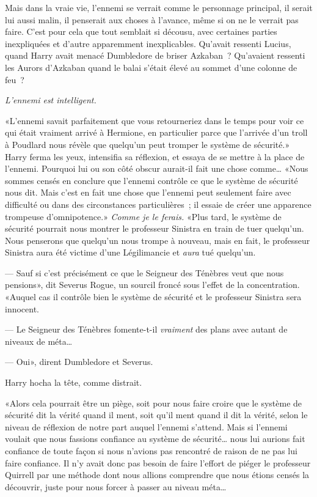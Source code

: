 Mais dans la vraie vie, l'ennemi se verrait comme le personnage principal, il serait lui aussi malin, il penserait aux choses à l'avance, même si on ne le verrait pas faire. C'est pour cela que tout semblait si décousu, avec certaines parties inexpliquées et d'autre apparemment inexplicables. Qu'avait ressenti Lucius, quand Harry avait menacé Dumbledore de briser Azkaban~? Qu'avaient ressenti les Aurors d'Azkaban quand le balai s'était élevé au sommet d'une colonne de feu~?

\emph{L'ennemi est intelligent.}

«L'ennemi savait parfaitement que vous retourneriez dans le temps pour voir ce qui était vraiment arrivé à Hermione, en particulier parce que l'arrivée d'un troll à Poudlard nous révèle que quelqu'un peut tromper le système de sécurité.» Harry ferma les yeux, intensifia sa réflexion, et essaya de se mettre à la place de l'ennemi. Pourquoi lui ou son côté obscur aurait-il fait une chose comme… «Nous sommes censés en conclure que l'ennemi contrôle ce que le système de sécurité nous dit. Mais c'est en fait une chose que l'ennemi peut seulement faire avec difficulté ou dans des circonstances particulières~; il essaie de créer une apparence trompeuse d'omnipotence.» \emph{Comme je le ferais.} «Plus tard, le système de sécurité pourrait nous montrer le professeur Sinistra en train de tuer quelqu'un. Nous penserons que quelqu'un nous trompe à nouveau, mais en fait, le professeur Sinistra aura été victime d'une Légilimancie et \emph{aura} tué quelqu'un.

--- Sauf si c'est précisément ce que le Seigneur des Ténèbres veut que nous pensions», dit Severus Rogue, un sourcil froncé sous l'effet de la concentration. «Auquel cas il contrôle bien le système de sécurité et le professeur Sinistra sera innocent.

--- Le Seigneur des Ténèbres fomente-t-il \emph{vraiment} des plans avec autant de niveaux de méta…

--- Oui», dirent Dumbledore et Severus.

Harry hocha la tête, comme distrait.

«Alors cela pourrait être un piège, soit pour nous faire croire que le système de sécurité dit la vérité quand il ment, soit qu'il ment quand il dit la vérité, selon le niveau de réflexion de notre part auquel l'ennemi s'attend. Mais si l'ennemi voulait que nous fassions confiance au système de sécurité… nous lui aurions fait confiance de toute façon si nous n'avions pas rencontré de raison de ne pas lui faire confiance. Il n'y avait donc pas besoin de faire l'effort de piéger le professeur Quirrell par une méthode dont nous allions comprendre que nous étions censés la découvrir, juste pour nous forcer à passer au niveau méta…

